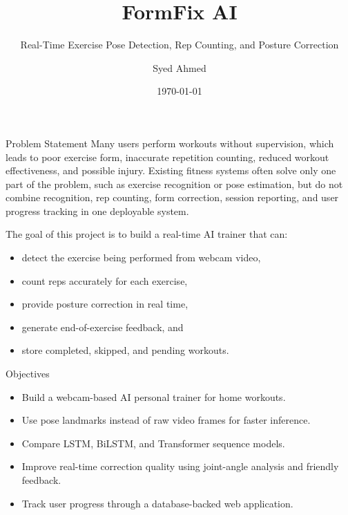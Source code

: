\documentclass[aspectratio=169]{beamer}
\title{FormFix AI}
\subtitle{Real-Time Exercise Pose Detection, Rep Counting, and Posture Correction}
\author{Syed Ahmed}
\institute{Mini Project Presentation}
\date{\today}
\begin{document}
\begin{frame}
  \titlepage
\end{frame}

\begin{frame}{Problem Statement}
\justifying
Many users perform workouts without supervision, which leads to poor exercise form, inaccurate repetition counting, reduced workout effectiveness, and possible injury. Existing fitness systems often solve only one part of the problem, such as exercise recognition or pose estimation, but do not combine recognition, rep counting, form correction, session reporting, and user progress tracking in one deployable system.

\vspace{0.4cm}
The goal of this project is to build a real-time AI trainer that can:
\begin{itemize}
  \item detect the exercise being performed from webcam video,
  \item count reps accurately for each exercise,
  \item provide posture correction in real time,
  \item generate end-of-exercise feedback, and
  \item store completed, skipped, and pending workouts.
\end{itemize}
\end{frame}

\begin{frame}{Objectives}
\begin{itemize}
  \item Build a webcam-based AI personal trainer for home workouts.
  \item Use pose landmarks instead of raw video frames for faster inference.
  \item Compare LSTM, BiLSTM, and Transformer sequence models.
  \item Improve real-time correction quality using joint-angle analysis and friendly feedback.
  \item Track user progress through a database-backed web application.
\end{itemize}
\end{frame}
\end{document}
